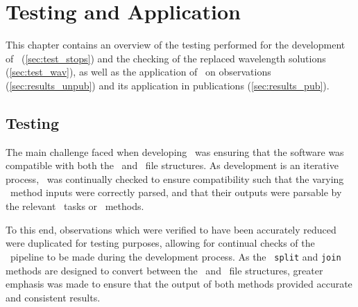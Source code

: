 \chapter{Testing and Application}

This chapter contains an overview of the testing performed for the development of \stops\ (\autoref{sec:test_stops}) and the checking of the replaced wavelength solutions (\autoref{sec:test_wav}), as well as the application of \stops\ on observations (\autoref{sec:results_unpub}) and its application in publications (\autoref{sec:results_pub}).

\section[Testing \textsc{stops}]{Testing \stops} \label{sec:test_stops}

The main challenge faced when developing \stops\ was ensuring that the software was compatible with both the \polsalt\ and \iraf\ file structures. As development is an iterative process, \stops\ was continually checked to ensure compatibility such that the varying \stops\ method inputs were correctly parsed, and that their outputs were parsable by the relevant \iraf\ tasks or \polsalt\ methods.

To this end, observations which were verified to have been accurately reduced were duplicated for testing purposes, allowing for continual checks of the \stops\ pipeline to be made during the development process. As the \stops\ \texttt{split} and \texttt{join} methods are designed to convert between the \polsalt\ and \iraf\ file structures, greater emphasis was made to ensure that the output of both methods provided accurate and consistent results.



